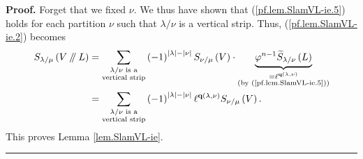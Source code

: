 \documentclass[numbers=enddot,12pt,final,onecolumn,notitlepage]{scrartcl}%
\numberwithin{exer}{section}
\theoremstyle{definition}
\newenvironment{proof}[1][Proof]{\noindent\textbf{#1.} }{\ \rule{0.5em}{0.5em}}
\let\sumnonlimits\sum
\renewcommand{\sum}{\sumnonlimits\limits}
\newcommand{\sslash}{\mathbin{/\mkern-5mu/}}
\theoremstyle{plainsl}
\begin{document}
\begin{proof}
Forget that we fixed $\nu$. We thus have shown that (\ref{pf.lem.SlamVL-ie.5})
holds for each partition $\nu$ such that $\lambda/\nu$ is a vertical strip.
Thus, (\ref{pf.lem.SlamVL-ie.2}) becomes%
\begin{align*}
S_{\lambda/\mu}\left(  V\sslash L\right)   &  =\sum_{\substack{\lambda
/\nu\text{ is a}\\\text{vertical strip}}}\left(  -1\right)  ^{\left\vert
\lambda\right\vert -\left\vert \nu\right\vert }S_{\nu/\mu}\left(  V\right)
\cdot\underbrace{\varphi^{n-1}\widetilde{S}_{\lambda/\nu}\left(  L\right)
}_{\substack{=\ell^{\mathbf{q}\left(  \lambda,\nu\right)  }\\\text{(by
(\ref{pf.lem.SlamVL-ie.5}))}}}\\
&  =\sum_{\substack{\lambda/\nu\text{ is a}\\\text{vertical strip}}}\left(
-1\right)  ^{\left\vert \lambda\right\vert -\left\vert \nu\right\vert }%
\ell^{\mathbf{q}\left(  \lambda,\nu\right)  }S_{\nu/\mu}\left(  V\right)  .
\end{align*}
This proves Lemma \ref{lem.SlamVL-ie}.
\end{proof}
\end{document}

